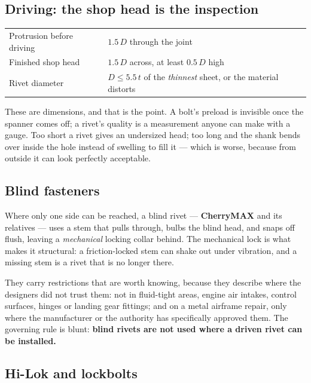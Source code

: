 \documentclass[11pt,a4paper]{article}
\begin{document}
\subsection{Driving: the shop head is the inspection}

\begin{center}\small
\begin{tabular}{@{}ll@{}}
\toprule
Protrusion before driving & $1.5\,D$ through the joint\\
Finished shop head & $1.5\,D$ across, at least $0.5\,D$ high\\
Rivet diameter & $D \le 5.5\,t$ of the \emph{thinnest} sheet, or the material distorts\\
\bottomrule
\end{tabular}
\end{center}

\medskip
These are dimensions, and that is the point. A bolt's preload is invisible once the spanner comes
off; a rivet's quality is a measurement anyone can make with a gauge. Too short a rivet gives an
undersized head; too long and the shank bends over inside the hole instead of swelling to fill it
--- which is worse, because from outside it can look perfectly acceptable.

\subsection{Blind fasteners}

Where only one side can be reached, a blind rivet --- \textbf{CherryMAX} and its relatives --- uses a
stem that pulls through, bulbs the blind head, and snaps off flush, leaving a \emph{mechanical}
locking collar behind. The mechanical lock is what makes it structural: a friction-locked stem can
shake out under vibration, and a missing stem is a rivet that is no longer there.

\medskip
They carry restrictions that are worth knowing, because they describe where the designers did not
trust them: not in fluid-tight areas, engine air intakes, control surfaces, hinges or landing gear
fittings; and on a metal airframe repair, only where the manufacturer or the authority has
specifically approved them. The governing rule is blunt: \textbf{blind rivets are not used where a
driven rivet can be installed.}

\subsection{Hi-Lok and lockbolts}
\end{document}
